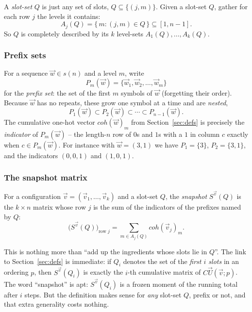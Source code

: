 \label{def:slot}A \emph{slot-set} $Q$ is just any set of slots, $Q\subseteq\{(j,m)\}$.  Given a
slot-set $Q$, gather for each row $j$ the levels it contains:
\[
A_j(Q)=\{\,m:(j,m)\in Q\,\}\subseteq[1,n-1].
\]
So $Q$ is completely described by its $k$ level-sets $A_1(Q),\ldots,A_k(Q)$.

\subsubsection*{Prefix sets}

\label{def:prefix}For a sequence $\vec w\in s(n)$ and a level $m$, write
\[
P_m(\vec w)=\{\vec w_1,\vec w_2,\ldots,\vec w_m\}
\]
for the \emph{prefix set}: the set of the first $m$ symbols of $\vec w$ (forgetting
their order).  Because $\vec w$ has no repeats, these grow one symbol at a time and
are \emph{nested},
\[
P_1(\vec w)\subset P_2(\vec w)\subset\cdots\subset P_{n-1}(\vec w).
\]
The cumulative one-hot vector $coh(\vec w)_m$ from Section~\ref{sec:defs} is precisely the
\emph{indicator} of $P_m(\vec w)$ -- the length-$n$ row of $0$s and $1$s with a $1$
in column $c$ exactly when $c\in P_m(\vec w)$.  For instance with $\vec w=(3,1)$ we
have $P_1=\{3\}$, $P_2=\{3,1\}$, and the indicators $(0,0,1)$ and $(1,0,1)$.

\subsubsection*{The snapshot matrix}

\begin{definition}\label{def:snapshot}
For a configuration $\vec v=(\vec v_1,\ldots,\vec v_k)$ and a slot-set $Q$, the
\emph{snapshot} $S^{\vec v}(Q)$ is the $k\times n$ matrix whose row $j$ is the sum
of the indicators of the prefixes named by $Q$:
\[
\bigl(S^{\vec v}(Q)\bigr)_{\text{row }j}
=\sum_{m\in A_j(Q)} coh(\vec v_j)_m .
\]
\end{definition}

This is nothing more than ``add up the ingredients whose slots lie in $Q$''.  The
link to Section~\ref{sec:defs} is immediate: if $Q_i$ denotes the set of the \emph{first $i$
slots} in an ordering $p$, then $S^{\vec v}(Q_i)$ is exactly the $i$-th cumulative
matrix of $C\vec U(\vec v;p)$.  The word ``snapshot'' is apt: $S^{\vec v}(Q_i)$ is
a frozen moment of the running total after $i$ steps.  But the definition makes
sense for \emph{any} slot-set $Q$, prefix or not, and that extra generality costs
nothing.

